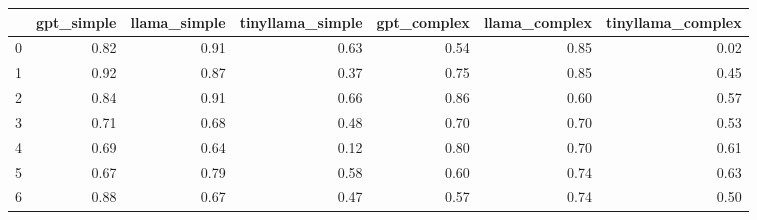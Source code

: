 \begin{tabular}{lrrrrrr}
\toprule
 & gpt_simple & llama_simple & tinyllama_simple & gpt_complex & llama_complex & tinyllama_complex \\
\midrule
0 & 0.82 & 0.91 & 0.63 & 0.54 & 0.85 & 0.02 \\
1 & 0.92 & 0.87 & 0.37 & 0.75 & 0.85 & 0.45 \\
2 & 0.84 & 0.91 & 0.66 & 0.86 & 0.60 & 0.57 \\
3 & 0.71 & 0.68 & 0.48 & 0.70 & 0.70 & 0.53 \\
4 & 0.69 & 0.64 & 0.12 & 0.80 & 0.70 & 0.61 \\
5 & 0.67 & 0.79 & 0.58 & 0.60 & 0.74 & 0.63 \\
6 & 0.88 & 0.67 & 0.47 & 0.57 & 0.74 & 0.50 \\
\bottomrule
\end{tabular}
